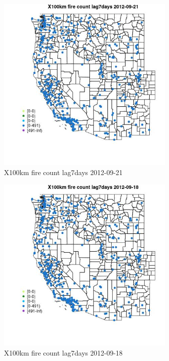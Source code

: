 \begin{figure} 
\centering  
\includegraphics[width=0.77\textwidth]{Code_Outputs/Report_ML_input_PM25_Step4_part_e_de_duplicated_aves_compiled_2019-05-14wNAs_MapObsX100km_fire_count_lag7days2012-09-21.jpg} 
\caption{\label{fig:Report_ML_input_PM25_Step4_part_e_de_duplicated_aves_compiled_2019-05-14wNAsMapObsX100km_fire_count_lag7days2012-09-21}X100km fire count lag7days 2012-09-21} 
\end{figure} 
 

\begin{figure} 
\centering  
\includegraphics[width=0.77\textwidth]{Code_Outputs/Report_ML_input_PM25_Step4_part_e_de_duplicated_aves_compiled_2019-05-14wNAs_MapObsX100km_fire_count_lag7days2012-09-18.jpg} 
\caption{\label{fig:Report_ML_input_PM25_Step4_part_e_de_duplicated_aves_compiled_2019-05-14wNAsMapObsX100km_fire_count_lag7days2012-09-18}X100km fire count lag7days 2012-09-18} 
\end{figure} 
 

